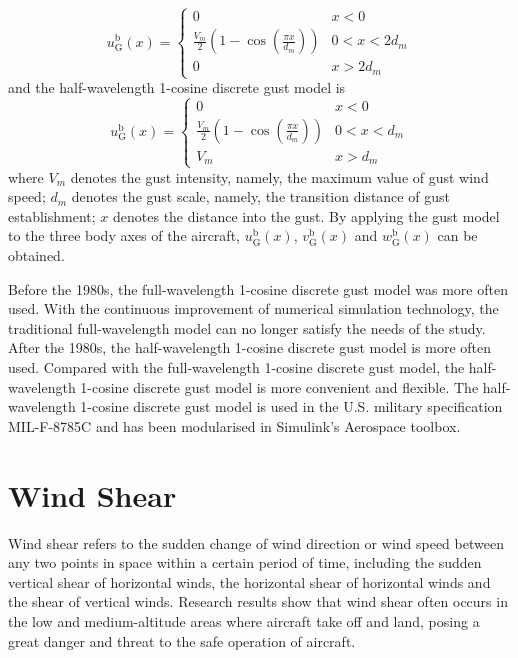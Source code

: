 \begin{equation}\label{eq6}
u_{\mathrm{G}}^{\mathrm{b}}(x)= \begin{cases}0 & x<0 \\ \frac{V_m}{2}\left(1-\cos \left(\frac{\pi x}{d_m}\right)\right) & 0<x<2 d_m \\ 0 & x>2 d_m\end{cases}
\end{equation}
and the half-wavelength 1-cosine discrete gust model is
\begin{equation}
u_{\mathrm{G}}^{\mathrm{b}}(x)= \begin{cases}0 & x<0 \\ \frac{V_m}{2}\left(1-\cos \left(\frac{\pi x}{d_m}\right)\right) & 0<x<d_m \\ V_m & x>d_m\end{cases}
\end{equation}
where $V_m$ denotes the gust intensity, namely, the maximum value of gust wind speed; $d_m$ denotes the gust scale, namely, the transition distance of gust establishment; $x$ denotes the distance into the gust. By applying the gust model to the three body axes of the aircraft, $u_{\mathrm{G}}^{\mathrm{b}}(x)$, $v_{\mathrm{G}}^{\mathrm{b}}(x)$ and $w_{\mathrm{G}}^{\mathrm{b}}(x)$ can be obtained.

Before the 1980s, the full-wavelength 1-cosine discrete gust model was more often used. With the continuous improvement of numerical simulation technology, the traditional full-wavelength model can no longer satisfy the needs of the study. After the 1980s, the half-wavelength 1-cosine discrete gust model is more often used. Compared with the full-wavelength 1-cosine discrete gust model, the half-wavelength 1-cosine discrete gust model is more convenient and flexible. The half-wavelength 1-cosine discrete gust model is used in the U.S. military specification MIL-F-8785C\cite{military1980u} and has been modularised in Simulink's Aerospace toolbox.

\section{Wind Shear}
Wind shear refers to the sudden change of wind direction or wind speed between any two points in space within a certain period of time, including the sudden vertical shear of horizontal winds, the horizontal shear of horizontal winds and the shear of vertical winds. Research results show that wind shear often occurs in the low and medium-altitude areas where aircraft take off and land, posing a great danger and threat to the safe operation of aircraft.

